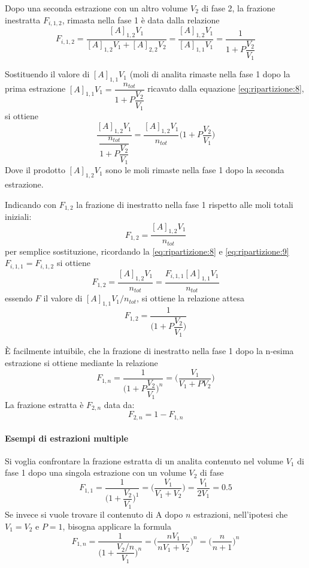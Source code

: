 Dopo una seconda estrazione con un altro volume $V_2$ di fase 2, la frazione inestratta $F_{i,1,2}$, rimasta nella fase 1 è data dalla relazione
\begin{equation} \label{eq:ripartizione:9}
F_{i,1,2} = \frac{[A]_{1,2} V_1}{[A]_{1,2} V_1 + [A]_{2,2} V_2} = \frac{[A]_{1,2} V_1}{[A]_{1,1} V_1} = \dfrac{1}{1 + P \dfrac{V_2}{V_1}}
\end{equation}

Sostituendo il valore di $[A]_{1,1} V_1$ (moli di analita rimaste nella fase 1 dopo la prima estrazione $[A]_{1,1} V_1 = \dfrac{n_{tot}}{1 + P \dfrac{V_2}{V_1}}$ ricavato dalla equazione \ref{eq:ripartizione:8}, si ottiene
\[
\frac{[A]_{1,2} V_1}{\dfrac{n_{tot}}{1 + P \dfrac{V_2}{V_1}}} = \frac{[A]_{1,2} V_1}{n_{tot}} \biggl(1 + P \frac{V_2}{V_1}\biggr)
\]
Dove il prodotto $[A]_{1,2} V_1$ sono le moli rimaste nella fase 1 dopo la seconda estrazione.

Indicando con $F_{1,2}$ la frazione di inestratto nella fase 1 rispetto alle moli totali iniziali:
\[
F_{1,2} = \frac{[A]_{1,2} V_1}{n_{tot}}
\]
per semplice sostituzione, ricordando la \ref{eq:ripartizione:8} e \ref{eq:ripartizione:9} $F_{i,1,1} = F_{i,1,2}$ si ottiene
\[
F_{1,2} = \frac{[A]_{1,2} V_1}{n_{tot}} = \frac{F_{i,1,1} [A]_{1,1} V_1}{n_{tot}}
\]
essendo $F$ il valore di $[A]_{1,1} V_1/n_{tot}$, si ottiene la relazione attesa
\[
F_{1,2} = \dfrac{1}{\biggl(1 + P \dfrac{V_2}{V_1}\biggr)}
\]

È facilmente intuibile, che la frazione di inestratto nella fase 1 dopo la n-esima estrazione si ottiene mediante la relazione
\[
F_{1,n} = \dfrac{1}{\biggl(1 + P \dfrac{V_2}{V_1}\biggr)^n} = \biggl(\frac{V_1}{V_1 + P V_2}\biggr)
\]
La frazione estratta è $F_{2,n}$ data da:
\[
F_{2,n} = 1 - F_{1,n}
\]
\paragraph{Esempi di estrazioni multiple}
Si voglia confrontare la frazione estratta di un analita contenuto nel volume $V_1$ di fase 1 dopo una singola estrazione con un volume $V_2$ di fase 
\[
F_{1,1} = \dfrac{1}{\biggl(1 + \dfrac{V_2}{V_1}\biggr)^1} = \biggl(\frac{V_1}{V_1 + V_2}\biggr) = \frac{V_1}{2 V_1} = 0.5
\]
Se invece si vuole trovare il contenuto di A dopo $n$ estrazioni, nell'ipotesi che $V_1 = V_2$ e $P = 1$, bisogna applicare la formula
\[
F_{1,n} = \dfrac{1}{\biggl(1 + \dfrac{V_2 / n}{V_1}\biggr)^n} = \biggl(\frac{n V_1}{n V_1 + V_2}\biggr)^n = \biggl(\frac{n}{n+1}\biggr)^n
\]





